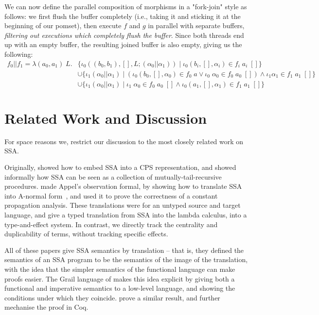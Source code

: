 \documentclass[acmsmall,screen,review]{acmart}
\begin{document}
We can now define the parallel composition of morphisms in a "fork-join" style
as follows: we first flush the buffer completely (i.e., taking it and sticking
it at the beginning of our pomset), then execute \(f\) and \(g\) in parallel
with separate buffers, \textit{filtering out executions which completely flush
the buffer}. Since both threads end up with an empty buffer, the resulting
joined buffer is also empty, giving us the following:
\begin{equation}
  \begin{aligned}
    f_0 || f_1 = \lambda (a_0, a_1)\;L. 
    & \{\iota_0 ((b_0, b_1), [], L;(\alpha_0 || \alpha_1)) 
      \mid \iota_0 (b_i, [], \alpha_i) \in f_i\;a_i\;[]\} 
    \\ & \cup \{\iota_1 (\alpha_0 || \alpha_1) \mid (\iota_0 (b_0, [], \alpha_0) \in f_0\;a \lor \iota_0\;\alpha_0 \in f_0\;a_0\;[]) \land \iota_1 \alpha_1 \in f_1\;a_1\;[]\} 
    \\ & \cup \{\iota_1 (\alpha_0 || \alpha_1) \mid \iota_1\;\alpha_0 \in f_0\;a_0\;[] \land \iota_0 (a_1, [], \alpha_1) \in f_1\;a_1\;[]\}
    \end{aligned}
\end{equation}

\section{Related Work and Discussion}

For space reasons we, restrict our discussion to the most closely related work
on SSA. 

Originally, \citet{kelsey-ssa-cps} showed how to embed SSA into a CPS
representation, and \citet{appel-ssa} showed informally how SSA can be seen as a
collection of mutually-tail-recursive procedures.
\citet{chakravarty-functional-ssa-2003} made Appel's observation formal, by
showing how to translate SSA into A-normal form~\cite{anf}, and used it to prove
the correctness of a constant propagation analysis. These translations were for
an untyped source and target language, and
\citet{typed-effect-ssa-rigon-torrens-vasconcellos-20} give a typed translation
from SSA into the lambda calculus, into a type-and-effect system. In contrast,
we directly track the centrality and duplicability of terms, without tracking
specific effects.

All of these papers give SSA semantics by translation -- that is, they defined
the semantics of an SSA program to be the semantics of the image of the
translation, with the idea that the simpler semantics of the functional language
can make proofs easier. The Grail language of \citet{beringer-imp-fun} makes
this idea explicit by giving both a functional and imperative semantics to a
low-level language, and showing the conditions under which they coincide.
\citet{schneider-imp-fun} prove a similar result, and further mechanise the
proof in Coq.
\end{document}
